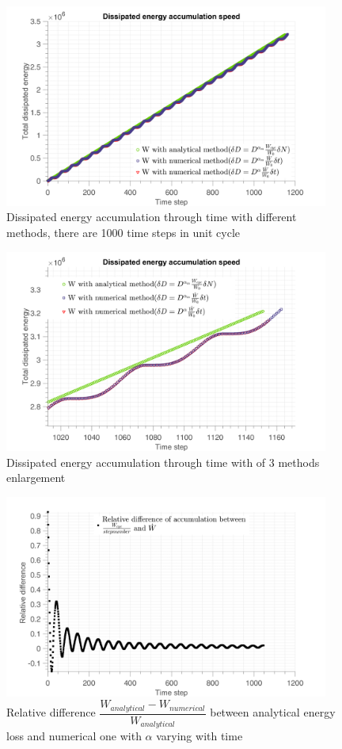 \begin{figure}[!h]
\centering
\includegraphics[width=0.95\textwidth]{figures//W_3methods2_100steps.png} 
\caption{Dissipated energy accumulation through time with different methods, there are 1000 time steps in unit cycle}
\label{fig.W3methods1000}
\end{figure}
\begin{figure}[!h]
\centering
\includegraphics[width=0.95\textwidth]{figures//W_3methods_100steps_enlarge.png} 
\caption{Dissipated energy accumulation through time with of 3 methods enlargement}
\label{fig.W3methods2enlarge}
\end{figure}
\begin{figure}[!h]
\centering
\includegraphics[width=0.95\textwidth]{figures//W_3methods_diff_100steps.png} 
\caption{Relative difference $\dfrac{W_{analytical}-W_{numerical}}{W_{analytical}}$ between analytical energy loss and numerical one with $\alpha$ varying with time}
\label{fig.W3methodsdiff}
\end{figure}
